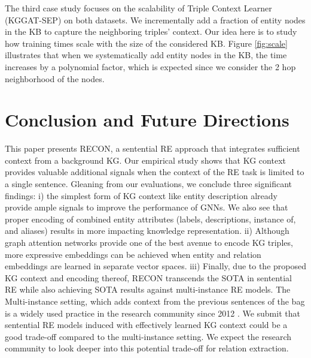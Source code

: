 \documentclass[sigconf]{acmart}
\begin{document}
The third case study focuses on the scalability of Triple Context Learner (KGGAT-SEP) on both datasets. We incrementally add a fraction of entity nodes in the KB to capture the neighboring triples' context. Our idea here is to study how training times scale with the size of the considered KB. Figure \ref{fig:scale} illustrates that when we systematically add entity nodes in the KB, the time increases by a polynomial factor, which is expected since we consider the 2 hop neighborhood of the nodes. 





\section{Conclusion and Future Directions} \label{sec:conclusion}
This paper presents RECON, a sentential RE approach that integrates sufficient context from a background KG. Our empirical study shows that KG context provides valuable additional signals when the context of the RE task is limited to a single sentence. Gleaning from our evaluations, we conclude three significant findings: i) the simplest form of KG context like entity description already provide ample signals to improve the performance of GNNs. We also see that proper encoding of combined entity attributes (labels, descriptions, instance of, and aliases) results in more impacting knowledge representation. ii) Although graph attention networks provide one of the best avenue to encode KG triples, more expressive embeddings can be achieved when entity and relation embeddings are learned in separate vector spaces. iii) Finally, due to the proposed KG context and encoding thereof, RECON transcends the SOTA in sentential RE while also achieving SOTA results against multi-instance RE models. The Multi-instance setting, which adds context from the previous sentences of the bag is a widely used practice in the research community since 2012 \cite{DBLP:conf/emnlp/SurdeanuTNM12,DBLP:conf/naacl/XuB19,DBLP:conf/aaai/WuFZ19}. We submit that sentential RE models induced with effectively learned KG context could be a good trade-off compared to the multi-instance setting. We expect the research community to look deeper into this potential trade-off for relation extraction. 
\end{document}
